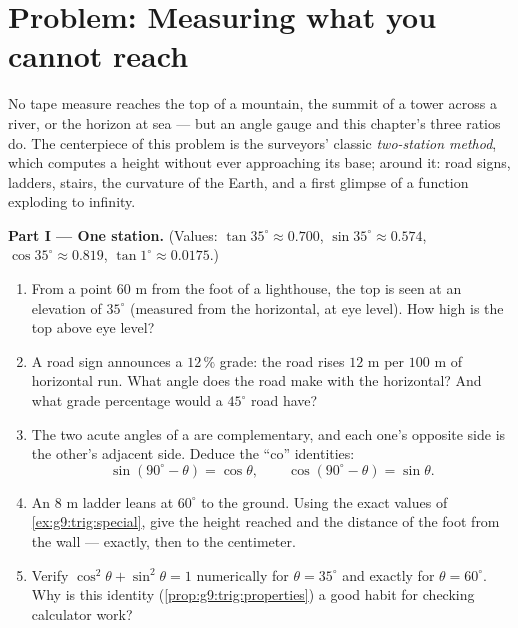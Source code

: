 \section{Problem: Measuring what you cannot reach}

\begin{problem}
\label{pb:g9:trig:1}
No tape measure reaches the top of a mountain, the summit of a
tower across a river, or the horizon at sea --- but an angle
gauge and this chapter's three ratios do. The centerpiece of this
problem is the surveyors' classic \emph{two-station method},
which computes a height without ever approaching its base;
around it: road signs, ladders, stairs, the curvature of the
Earth, and a first glimpse of a function exploding to infinity.

\medskip
\noindent\textbf{Part I --- One station.}
(Values: $\tan 35^\circ \approx 0.700$,
$\sin 35^\circ \approx 0.574$, $\cos 35^\circ \approx 0.819$,
$\tan 1^\circ \approx 0.0175$.)
\begin{enumerate}
  \item From a point $60$ m from the foot of a lighthouse, the
        top is seen at an elevation of $35^\circ$ (measured from
        the horizontal, at eye level). How high is the top above
        eye level?
  \item A road sign announces a $12\,\%$ grade: the road rises
        $12$ m per $100$ m of horizontal run. What angle does
        the road make with the horizontal? And what grade
        percentage would a $45^\circ$ road have?
  \item The two acute angles of a  are
        complementary, and each one's opposite side is the
        other's adjacent side. Deduce the ``co'' identities:
        \[
        \sin(90^\circ - \theta) = \cos\theta,
        \qquad
        \cos(90^\circ - \theta) = \sin\theta .
        \]
  \item An $8$ m ladder leans at $60^\circ$ to the ground.
        Using the exact values of \cref{ex:g9:trig:special},
        give the height reached and the distance of the foot
        from the wall --- exactly, then to the centimeter.
  \item Verify $\cos^2\theta + \sin^2\theta = 1$ numerically for
        $\theta = 35^\circ$ and exactly for $\theta = 60^\circ$.
        Why is this identity
        (\cref{prop:g9:trig:properties}) a good habit for
        checking calculator work?
\end{enumerate}


\end{problem}
